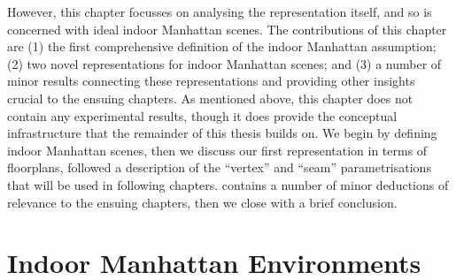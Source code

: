 However, this chapter focusses on analysing the representation itself,
and so is concerned with ideal indoor Manhattan scenes. The
contributions of this chapter are (1) the first comprehensive
definition of the indoor Manhattan assumption; (2) two novel
representations for indoor Manhattan scenes; and (3) a number of minor
results connecting these representations and providing other insights
crucial to the ensuing chapters. As mentioned above, this chapter does
not contain any experimental results, though it does provide the
conceptual infrastructure that the remainder of this thesis builds
on. We begin by defining indoor Manhattan scenes, then we discuss our
first representation in terms of floorplans, followed a description of
the ``vertex'' and ``seam'' parametrisations that will be used in
following chapters.  contains a number of minor
deductions of relevance to the ensuing chapters, then we close with a
brief conclusion.

\section{Indoor Manhattan Environments}

